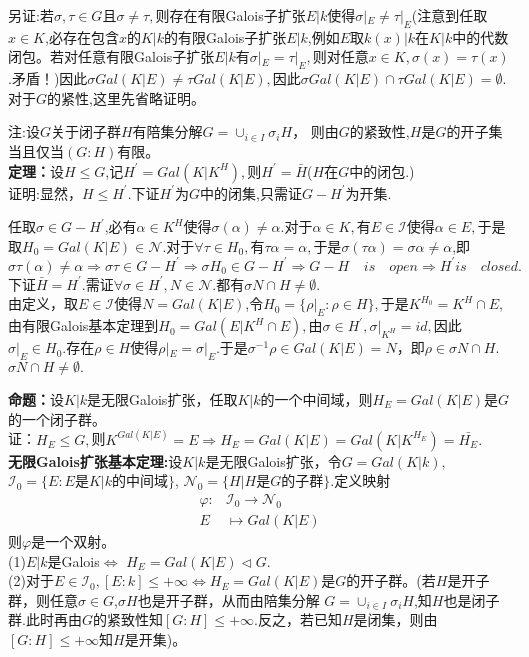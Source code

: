 \documentclass[UTF8]{article}
\begin{document}
另证:若$\sigma,\tau \in G$且$\sigma \neq \tau,$则存在有限Galois子扩张$E|k$使得$\sigma|_{E}\neq \tau|_{E}$(注意到任取$x\in K$,必存在包含$x$的$K|k$的有限Galois子扩张$E|k$,例如$E$取$k(x)|k$在$K|k$中的代数闭包。若对任意有限Galois子扩张$E|k$有$\sigma|_{E}=\tau|_{E},$则对任意$x\in K,\sigma(x)=\tau(x)$.矛盾！)因此$\sigma Gal(K|E)\neq \tau Gal(K|E),$因此$\sigma Gal(K|E)\cap \tau Gal(K|E)=\emptyset.$\\
对于$G$的紧性,这里先省略证明。


注:设$G$关于闭子群$H$有陪集分解$G=\cup_{i\in I}\sigma_{i}H$，
则由$G$的紧致性,$H$是$G$的开子集当且仅当$(G:H)$有限。\\
\textbf{定理：}设$H\leq G$,记$H^{'}=Gal(K|K^{H}),$则$H^{'}=\bar{H}$($H$在$G$中的闭包.)\\
证明:显然，$H\leq H^{'}.$下证$H^{'}$为$G$中的闭集,只需证$G-H^{'}$为开集.


任取$\sigma\in G-H^{'}$,必有$\alpha \in K^{H}$使得$\sigma(\alpha)\neq \alpha.$对于$\alpha\in K,$有$E\in\mathcal{I}$使得$\alpha\in E,$于是取$H_{0}=Gal(K|E)\in\mathcal{N}.$对于$\forall\tau\in H_{0},$有$\tau\alpha=\alpha ,$于是$\sigma(\tau\alpha)=\sigma\alpha\neq \alpha $,即$$\sigma\tau(\alpha)\neq\alpha 
\Rightarrow\sigma\tau\in G-H^{'}\Rightarrow\sigma H_{0}\in G-H^{'}\Rightarrow G-H^{}\quad is\quad open\Rightarrow H^{'}is\quad  closed.$$
下证$\bar{H}=H^{'}.$需证$\forall \sigma \in H^{'},N\in \mathcal{N}.$都有$\sigma N\cap H\neq \emptyset.$\\
由定义，取$E\in \mathcal{I}$使得$N=Gal(K|E)$,令$H_{0}=\{\rho|_{E}:\rho\in H\},$于是$K^{H_{0}}=K^{H}\cap E,$由有限Galois基本定理到$H_{0}=Gal(E|K^{H}\cap E),$由$\sigma \in H^{'},\sigma|_{K^{H}}=id,$因此$\sigma|_{E}\in H_{0}.$存在$\rho\in H$使得$
\rho|_{E}=\sigma|_{E}.$于是$\sigma^{-1}\rho \in Gal(K|E)=N$，即$\rho\in \sigma N\cap H.$$\sigma N\cap H\neq \emptyset.$


\textbf{命题：}设$K|k$是无限Galois扩张，任取$K|k$的一个中间域，则$H_{E}=Gal(K|E)$是$G$的一个闭子群。\\
证：$H_{E}\leq G,$则$K^{Gal(K|E)}=E\Rightarrow H_{E}=Gal(K|E)=Gal(K|K^{H_{E}})=\bar{H_{E}}.$\\
\textbf{无限Galois扩张基本定理:}设$K|k$是无限Galois扩张，令$G=Gal(K|k),$ $\mathcal{I}_{0}=\{E:E$是$K|k$的中间域$\}$,
$\mathcal{N}_{0}=\{H|H$是$G$的子群$\}$.定义映射
\[
\begin{split}
\varphi:&\mathcal{I}_{0}\rightarrow \mathcal{N}_{0}\\
E&\mapsto Gal(K|E)
\end{split}
\]
则$\varphi$是一个双射。\\
(1)$E|k$是Galois$\Leftrightarrow$ $H_{E}=Gal(K|E)\triangleleft G$.\\
(2)对于$E\in\mathcal{I}_{0},[E:k]\leq +\infty\Leftrightarrow H_{E}=Gal(K|E)$是$G$的开子群。(若$H$是开子群，则任意$\sigma\in G$,$\sigma H$也是开子群，从而由陪集分解
$G=\cup_{i\in I}\sigma_{i}H$,知$H$也是闭子群.此时再由$G$的紧致性知$[G:H]\leq +\infty$.反之，若已知$H$是闭集，则由$[G:H]\leq +\infty$知$H$是开集)。
\end{document}
